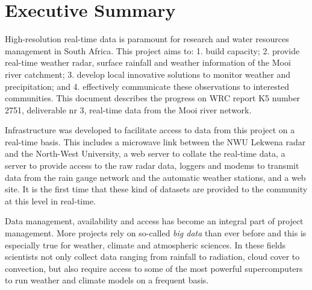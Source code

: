 \documentclass{wrcreport}
\begin{document}

     \maketitle


\chapter*{Executive Summary}

High-resolution real-time data is paramount for research and water
resources management in South Africa. This project aims to: 1. build
capacity; 2. provide real-time weather radar, surface rainfall and
weather information of the Mooi river catchment; 3. develop local
innovative solutions to monitor weather and precipitation; and 4.
effectively communicate these observations to interested communities.
This document describes the progress on WRC report K5 number 2751,
deliverable nr 3, real-time data from the Mooi river network.

Infrastructure was developed to facilitate access to data from this
project on a real-time basis. This includes a microwave link between
the NWU Lekwena radar and the North-West University, a web server to
collate the real-time data, a server to provide access to the raw radar
data, loggers and modems to transmit data from the rain gauge network
and the automatic weather stations, and a web site. It is the first
time that these kind of datasets are provided to the community at this
level in real-time.

Data management, availability and access has become an integral part
of project management. More projects rely on so-called \textit{big
data} than ever before and this is especially true for weather,
climate and atmospheric sciences. In these fields scientists not only
collect data ranging from rainfall to radiation, cloud cover to
convection, but also require access to some of the most powerful
supercomputers to run weather and climate models on a frequent basis.
\end{document}
